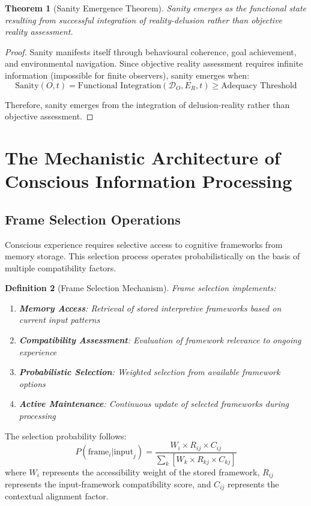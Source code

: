 \documentclass[12pt,a4paper]{article}
\newtheorem{theorem}{Theorem}[section]
\newtheorem{definition}[theorem]{Definition}
\begin{document}
\begin{theorem}[Sanity Emergence Theorem]
Sanity emerges as the functional state resulting from successful integration of reality-delusion rather than objective reality assessment.
\end{theorem}

\begin{proof}
Sanity manifests itself through behavioural coherence, goal achievement, and environmental navigation. Since objective reality assessment requires infinite information (impossible for finite observers), sanity emerges when:
$$\text{Sanity}(O, t) = \text{Functional Integration}(\mathcal{D}_O, E_R, t) \geq \text{Adequacy Threshold}$$

Therefore, sanity emerges from the integration of delusion-reality rather than objective assessment.
\end{proof}
\section{The Mechanistic Architecture of Conscious Information Processing}

\subsection{Frame Selection Operations}

Conscious experience requires selective access to cognitive frameworks from memory storage. This selection process operates probabilistically on the basis of multiple compatibility factors.

\begin{definition}[Frame Selection Mechanism]
Frame selection implements:
\begin{enumerate}
\item \textbf{Memory Access}: Retrieval of stored interpretive frameworks based on current input patterns
\item \textbf{Compatibility Assessment}: Evaluation of framework relevance to ongoing experience  
\item \textbf{Probabilistic Selection}: Weighted selection from available framework options
\item \textbf{Active Maintenance}: Continuous update of selected frameworks during processing
\end{enumerate}
\end{definition}

The selection probability follows:
\begin{equation}
P(\text{frame}_i | \text{input}_j) = \frac{W_i \times R_{ij} \times C_{ij}}{\sum_k [W_k \times R_{kj} \times C_{kj}]}
\end{equation}
where $W_i$ represents the accessibility weight of the stored framework, $R_{ij}$ represents the input-framework compatibility score, and $C_{ij}$ represents the contextual alignment factor.
\end{document}
